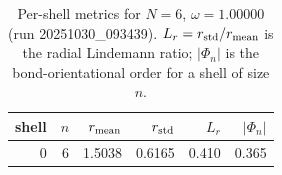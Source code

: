 \begin{table}[t]
\centering
\small
\setlength{\tabcolsep}{4pt}
\renewcommand{\arraystretch}{1.15}
\begin{tabular}{r r r r r r}
\toprule
shell & $n$ & $r_{\rm mean}$ & $r_{\rm std}$ & $L_r$ & $|\Phi_n|$ \\
\midrule
0 & 6 & 1.5038 & 0.6165 & 0.410 & 0.365 \\
\bottomrule
\end{tabular}
\caption{Per-shell metrics for $N=6$, $\omega=1.00000$ (run 20251030_093439). $L_r=r_{\rm std}/r_{\rm mean}$ is the radial Lindemann ratio; $|\Phi_n|$ is the bond-orientational order for a shell of size $n$.}
\end{table}
